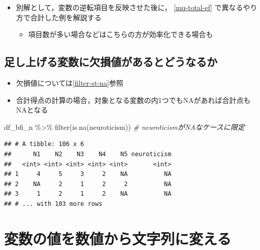 \documentclass[
  xelatex,ja=standard, b5paper]{bxjsbook}
\newenvironment{Shaded}{\begin{snugshade}}{\end{snugshade}}
\newcommand{\CommentTok}[1]{\textcolor[rgb]{0.56,0.35,0.01}{\textit{#1}}}
\newcommand{\FunctionTok}[1]{\textcolor[rgb]{0.00,0.00,0.00}{#1}}
\newcommand{\NormalTok}[1]{#1}
\newcommand{\SpecialCharTok}[1]{\textcolor[rgb]{0.00,0.00,0.00}{#1}}
\providecommand{\tightlist}{%
  \setlength{\itemsep}{0pt}\setlength{\parskip}{0pt}}
\begin{document}
\begin{itemize}
\tightlist
\item
  別解として，変数の逆転項目を反映させた後に， \ref{mu-total-ef} で異なるやり方で合計した例を解説する

  \begin{itemize}
  \tightlist
  \item
    項目数が多い場合などはこちらの方が効率化できる場合も
  \end{itemize}
\end{itemize}

\hypertarget{mu-total-na}{%
\subsection{足し上げる変数に欠損値があるとどうなるか}\label{mu-total-na}}

\begin{itemize}
\tightlist
\item
  欠損値については\ref{filter-st-na}参照
\item
  合計得点の計算の場合，対象となる変数の内1つでもNAがあれば合計点もNAとなる
\end{itemize}

\begin{Shaded}
\begin{Highlighting}[]
\NormalTok{df\_bfi\_n }\SpecialCharTok{\%\textgreater{}\%} 
  \FunctionTok{filter}\NormalTok{(}\FunctionTok{is.na}\NormalTok{(neuroticism))     }\CommentTok{\# neuroticismがNAなケースに限定}
\end{Highlighting}
\end{Shaded}

\begin{verbatim}
## # A tibble: 106 x 6
##      N1    N2    N3    N4    N5 neuroticism
##   <int> <int> <int> <int> <int>       <int>
## 1     4     5     3     2    NA          NA
## 2    NA     2     1     2     2          NA
## 3     1     2     1     2    NA          NA
## # ... with 103 more rows
\end{verbatim}

\hypertarget{ux5909ux6570ux306eux5024ux3092ux6570ux5024ux304bux3089ux6587ux5b57ux5217ux306bux5909ux3048ux308b}{%
\section{変数の値を数値から文字列に変える}\label{ux5909ux6570ux306eux5024ux3092ux6570ux5024ux304bux3089ux6587ux5b57ux5217ux306bux5909ux3048ux308b}}
\end{document}
